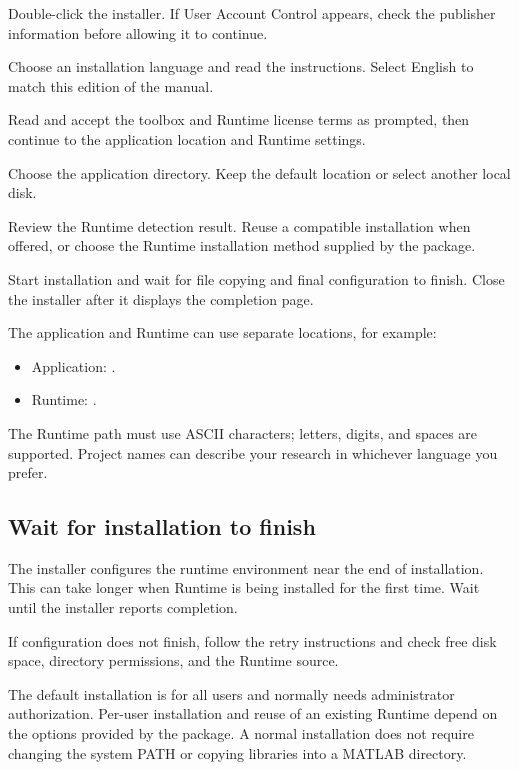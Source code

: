 \begin{steps}
\item Double-click the installer. If User Account Control appears, check the publisher information before allowing it to continue.
\item Choose an installation language and read the instructions. Select English to match this edition of the manual.
\item Read and accept the toolbox and Runtime license terms as prompted, then continue to the application location and Runtime settings.
\item Choose the application directory. Keep the default location or select another local disk.
\item Review the Runtime detection result. Reuse a compatible installation when offered, or choose the Runtime installation method supplied by the package.
\item Start installation and wait for file copying and final configuration to finish. Close the installer after it displays the completion page.
\end{steps}

The application and Runtime can use separate locations, for example:
\begin{itemize}[nosep]
\item Application: .
\item Runtime: .
\end{itemize}
The Runtime path must use ASCII characters; letters, digits, and spaces are supported. Project names can describe your research in whichever language you prefer.

\subsection{Wait for installation to finish}

The installer configures the runtime environment near the end of installation. This can take longer when Runtime is being installed for the first time. Wait until the installer reports completion.

If configuration does not finish, follow the retry instructions and check free disk space, directory permissions, and the Runtime source.

The default installation is for all users and normally needs administrator authorization. Per-user installation and reuse of an existing Runtime depend on the options provided by the package. A normal installation does not require changing the system PATH or copying libraries into a MATLAB\regmark{} directory.

